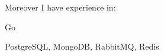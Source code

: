 Moreover I have experience in:
\begin{bulist}
\item Go
\item PostgreSQL, MongoDB, RabbitMQ, Redis
\end{bulist}
